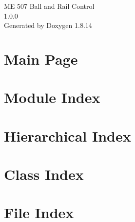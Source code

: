 \documentclass[twoside]{book}
\newcommand{\+}{\discretionary{\mbox{\scriptsize$\hookleftarrow$}}{}{}}
\newcommand{\clearemptydoublepage}{%
  \newpage{\pagestyle{empty}\cleardoublepage}%
}
\begin{document}
\hypersetup{pageanchor=false,
             bookmarksnumbered=true,
             pdfencoding=unicode
            }
\begin{titlepage}
\vspace*{7cm}
\begin{center}%
{\Large ME 507 Ball and Rail Control \\[1ex]\large 1.\+0.\+0 }\\
\vspace*{1cm}
{\large Generated by Doxygen 1.8.14}\\
\end{center}
\end{titlepage}
\clearemptydoublepage
{}
\tableofcontents
\clearemptydoublepage
{}
\hypersetup{pageanchor=true}

\chapter{Main Page}
\label{index}\hypertarget{index}{}
\chapter{Module Index}

\chapter{Hierarchical Index}

\chapter{Class Index}

\chapter{File Index}

\end{document}
